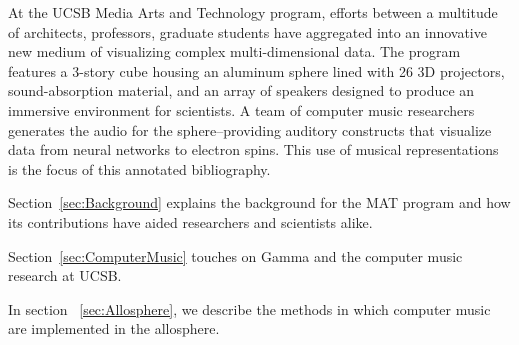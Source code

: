
	At the UCSB Media Arts and Technology program, efforts between a multitude of architects, professors, graduate students have aggregated into an innovative new medium of visualizing complex multi-dimensional data. The program features a 3-story cube housing an aluminum sphere lined with 26 3D projectors, sound-absorption material, and an array of speakers designed to produce an immersive environment for scientists. A team of computer music researchers generates the audio for the sphere--providing auditory constructs that visualize data from neural networks to electron spins. This use of musical representations is the focus of this annotated bibliography.

Section~\ref{sec:Background} explains the background for the MAT program and how its contributions have aided researchers and scientists alike.

Section~\ref{sec:ComputerMusic} touches on Gamma and the computer music research at UCSB.

In section ~\ref{sec:Allosphere}, we describe the methods in which computer music are implemented in the allosphere.

